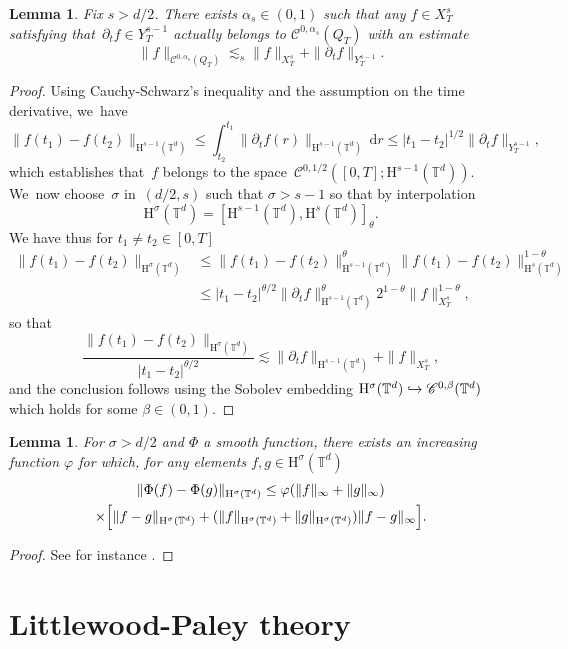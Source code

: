 \documentclass[10pt]{amsart}
\newcommand\hto{\mathrel{\lhook\joinrel\to}}
\newtheorem{lem}[prop]{Lemma}
\theoremstyle{definition}
\newcommand\T{\mathbb{T}}
\newcommand\dd{\mathrm{d}}
\renewcommand\H{\mathrm{H}}
\let\ffi\varphi
\begin{document}
\begin{lem}\label{lem:sobo2}
Fix $s>d/2$. There exists $\alpha_s\in(0,1)$ such that any $f\in X_T^s$ satisfying that~$\partial_t f \in Y_T^{s-1}$ actually belongs to $\mathscr{C}^{0,\alpha_s}(Q_T)$ with an estimate
\[
\|f\|_{\mathscr{C}^{0,\alpha_s}(Q_T)}\lesssim_s \|f\|_{X_T^s} + \|\partial_t f\|_{Y_T^{s-1}}.
\]
\end{lem}
\begin{proof}
Using Cauchy-Schwarz's inequality and the assumption on the time derivative, we~have
\[
\|f(t_1)-f(t_2)\|_{\H^{s-1}(\T^d)} \leq \int_{t_2}^{t_1}\| \partial_t f(r)\|_{\H^{s-1}(\T^d)}\,\dd r \leq |t_1-t_2|^{1/2}\|\partial_t f\|_{Y_T^{s-1}},
\]
which establishes that~$f$ belongs to the space~$\mathscr{C}^{0,1/2}([0,T];\H^{s-1}(\T^d))$. We~now choose~$\sigma $ in~$(d/2,s)$ such that $\sigma>s-1$ so that by interpolation
\[
\H^\sigma(\T^d) = [\H^{s-1}(\T^d),\H^{s}(\T^d)]_\theta.
\]
We have thus for $t_1\neq t_2\in [0,T]$
\begin{align*}\|f(t_1)-f(t_2)\|_{\H^\sigma(\T^d)} &\leq \|f(t_1)-f(t_2)\|_{\H^{s-1}(\T^d)}^\theta \|f(t_1)-f(t_2)\|^{1-\theta}_{\H^{s}(\T^d)}\\
&\leq |t_1-t_2|^{\theta/2} \|\partial_t f\|_{\H^{s-1}(\T^d)}^{\theta} 2^{1-\theta} \|f\|_{X_T^s}^{1-\theta},\end{align*}
so that
\[
\frac{\|f(t_1)-f(t_2)\|_{\H^{\sigma}(\T^d)}}{|t_1-t_2|^{\theta/2}} \lesssim \|\partial_t f\|_{\H^{s-1}(\T^d)} + \|f\|_{X_T^s},
\]
and the conclusion follows using the Sobolev embedding $\H^\sigma(\T^d)\hto \mathscr{C}^{0,\beta}(\T^d)$ which holds for some $\beta\in(0,1)$.
\end{proof}

\begin{lem}\label{lem:lipsob}
For $\sigma>d/2$ and $\Phi$ a smooth function, there exists an increasing function $\ffi$ for which, for any elements $f,g\in\H^{\sigma}(\T^d)$
\begin{multline}\label{ineq:Alip}
\|\Phi(f)-\Phi(g)\|_{\H^\sigma(\T^d)} \leq \ffi(\|f\|_{\infty}+\|g\|_\infty) \\
\times \Bigl[ \|f-g\|_{\H^\sigma(\T^d)}+(\|f\|_{\H^\sigma(\T^d)}+\|g\|_{\H^\sigma(\T^d)})\|f-g\|_\infty\Bigr].
\end{multline}
\end{lem}

\begin{proof}
See for instance \cite[Cor.\,2.91]{BCD}.
\end{proof}
\section{Littlewood-Paley theory}\label{sec:LP}
\end{document}
